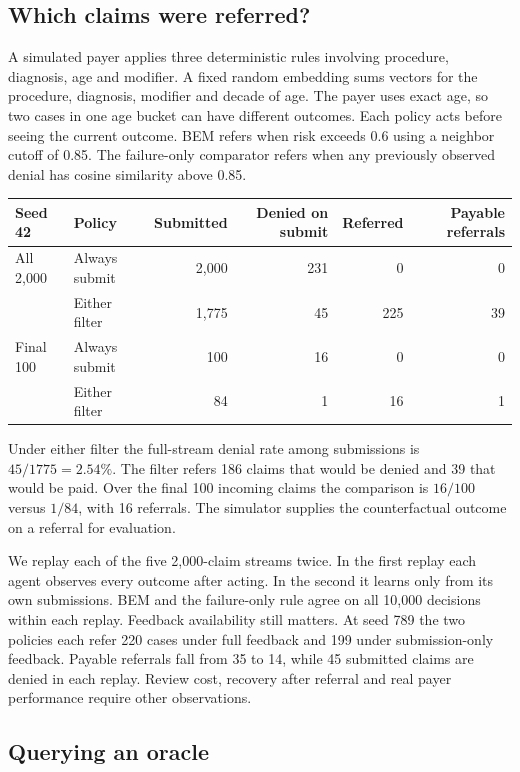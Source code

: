 \subsection{Which claims were referred?}

A simulated payer applies three deterministic rules involving procedure,
diagnosis, age and modifier. A fixed random embedding sums vectors for the
procedure, diagnosis, modifier and decade of age. The payer uses exact age,
so two cases in one age bucket can have different outcomes. Each policy
acts before seeing the current outcome. BEM refers when risk exceeds 0.6
using a neighbor cutoff of 0.85. The failure-only comparator refers when
any previously observed denial has cosine similarity above 0.85.

\begin{center}
\small
\begin{tabular}{llrrrr}
\toprule
Seed 42 & Policy & Submitted & Denied on submit & Referred & Payable referrals \\
\midrule
All 2,000 & Always submit & 2,000 & 231 & 0 & 0 \\
          & Either filter & 1,775 & 45  & 225 & 39 \\
Final 100 & Always submit & 100   & 16  & 0 & 0 \\
          & Either filter & 84    & 1   & 16 & 1 \\
\bottomrule
\end{tabular}
\end{center}

Under either filter the full-stream denial rate among submissions is
$45/1775=2.54\%$. The filter refers 186 claims that would be denied and
39 that would be paid. Over the final 100 incoming claims the comparison
is $16/100$ versus $1/84$, with 16 referrals. The simulator supplies the
counterfactual outcome on a referral for evaluation.

We replay each of the five 2,000-claim streams twice. In the first replay
each agent observes every outcome after acting. In the second it learns only
from its own submissions. BEM and the failure-only rule agree on all 10,000
decisions within each replay. Feedback availability still matters. At seed
789 the two policies each refer 220 cases under full feedback and 199 under
submission-only feedback. Payable referrals fall from 35 to 14, while 45
submitted claims are denied in each replay. Review cost, recovery after
referral and real payer performance require other observations.

\subsection{Querying an oracle}

